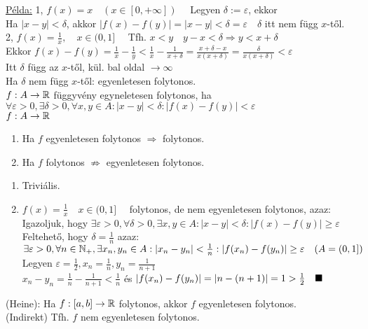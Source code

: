 \documentclass[a4paper,11pt]{article}
\begin{document}
\underline{Példa:} 1, $f(x)=x\quad(x\in[0,+\infty])\quad$ Legyen $\delta:=
\varepsilon$, ekkor\\ Ha $|x-y|<\delta$, akkor $|f(x)-f(y)|=|x-y|<\delta=
\varepsilon\quad\delta$ itt nem függ $x$-től.\\[0.2cm]
2, $f(x)=\frac{1}{x},\quad x\in(0,1]\quad$ Tfh. $x<y\quad y-x<\delta\Rightarrow
y<x+\delta$\\[0.1cm] Ekkor $f(x)-f(y)=\frac{1}{x}-\frac{1}{y}<\frac{1}{x}-
\frac{1}{x+\delta}=\frac{x+\delta-x}{x(x+\delta)}=\frac{\delta}{x(x+\delta)}<
\varepsilon$\\[0.1cm] Itt $\delta$ függ az $x$-től, kül. bal oldal $\to\infty$
\\[0.1cm] Ha $\delta$ nem függ $x$-től: egyenletesen folytonos.\\[0.2cm]
 $f:A\to\mathbb{R}$ függyvény egyneletesen folytonos, ha \\[0.1cm]
$\forall\varepsilon>0,\exists\delta>0,\forall x,y\in A:|x-y|<\delta:
|f(x)-f(y)|<\varepsilon$\\[0.2cm]
\tetel $f: A\to\mathbb{R}$
\begin{enumerate}
	\item Ha $f$ egyenletesen folytonos $\Rightarrow$ folytonos.
	\item Ha $f$ folytonos $\nRightarrow$ egyenletesen folytonos.
\end{enumerate}
\biz
\begin{enumerate}
	\item Triviális.
	\item $f(x)=\frac{1}{x}\quad x\in(0,1]\quad$ folytonos, de nem egyenletesen
	folytonos, azaz:\\[0.1cm] Igazoljuk, hogy $\exists\varepsilon>0,\forall
	\delta>0,\exists x,y\in A:|x-y|<\delta:|f(x)-f(y)|\geq\varepsilon$\\[0.1cm]
	Feltehető, hogy $\delta=\frac{1}{n}$ azaz:\\[0.1cm]$\exists\varepsilon>0,
	\forall n\in\mathbb{N}_+,\exists x_n,y_n\in A:|x_n-y_n|<\frac{1}{n}:
	|f(x_n)-f(y_n)|\geq\varepsilon\quad(A=(0,1])$\\[0.1cm] Legyen $\varepsilon=
	\frac{1}{2},x_n=\frac{1}{n},y_n=\frac{1}{n+1}$\\[0.1cm]$x_n-y_n=\frac{1}{n}-
	\frac{1}{n+1}<\frac{1}{n}$ és $|f(x_n)-f(y_n)|=|n-(n+1)|=1> \frac{1}{2}
	\quad\blacksquare$
\end{enumerate}
\tetel (Heine): Ha $f:[a,b]\to\mathbb{R}$ folytonos, akkor $f$ egyenletesen folytonos.\\[0.2cm]
\biz (Indirekt) Tfh. $f$ nem egyenletesen folytonos.\\[0.1cm]
\end{document}
